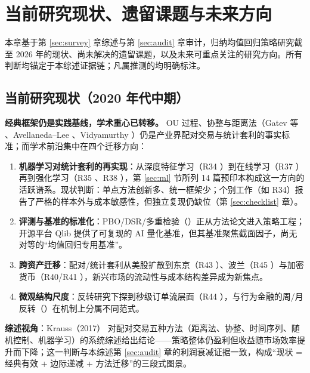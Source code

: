 \section{当前研究现状、遗留课题与未来方向}\label{sec:future}

本章基于第 \ref{sec:survey} 章综述与第 \ref{sec:audit} 章审计，归纳均值回归策略研究截至 2026 年的现状、尚未解决的遗留课题，以及未来可重点关注的研究方向。所有判断均锚定于本综述证据链；凡属推测的均明确标注。

\subsection{当前研究现状（2020 年代中期）}

\textbf{经典框架仍是实践基线，学术重心已转移。} OU 过程、协整与距离法（Gatev 等 \cite{gatev2006}、Avellaneda--Lee \cite{avellaneda2010}、Vidyamurthy \cite{vidyamurthy2004}）仍是产业界配对交易与统计套利的事实标准；而学术前沿集中在四个迁移方向：

\begin{enumerate}
  \item \textbf{机器学习对统计套利的再实现}：从深度特征学习（R34 \cite{arxiv_dl_sa}）到在线学习（R37 \cite{arxiv_online_sa}）再到强化学习（R35 \cite{arxiv_rl_sa}、R38 \cite{arxiv_rl_mr}），第 \ref{sec:ml} 节所列 14 篇预印本构成这一方向的活跃谱系。现状判断：单点方法创新多、统一框架少；个别工作（如 R34）报告了严格的样本外与成本敏感性，但独立复现仍缺位（第 \ref{sec:checklist} 章）。
  \item \textbf{评测与基准的标准化}：PBO/DSR/多重检验（\cite{bailey2014pbo,bailey2014dsr,harveylz2016}）正从方法论文进入策略工程；开源平台 Qlib \cite{qlib} 提供了可复现的 AI 量化基准，但其基准聚焦截面因子，尚无对等的“均值回归专用基准”。
  \item \textbf{跨资产迁移}：配对/统计套利从美股扩散到东京（R43 \cite{arxiv_tse}）、波兰（R45 \cite{arxiv_poland_sa}）与加密货币（R40/R41 \cite{arxiv_crypto_drl,arxiv_crypto_coint}），新兴市场的流动性与成本结构差异成为新焦点。
  \item \textbf{微观结构尺度}：反转研究下探到秒级订单流层面（R44 \cite{arxiv_microstructure}），与行为金融的周/月反转（\cite{lehmann1990,jegadeesh1990}）在机制上分属不同范式。
\end{enumerate}

\textbf{综述视角}：Krauss（2017）\cite{krauss2017} 对配对交易五种方法（距离法、协整、时间序列、随机控制、机器学习）的系统综述给出结论——策略整体仍盈利但收益随市场效率提升而下降；这一判断与本综述第 \ref{sec:audit} 章的利润衰减证据一致，构成“现状 = 经典有效 + 边际递减 + 方法迁移”的三段式图景。

